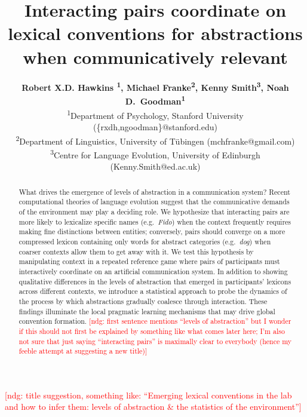 \documentclass[10pt,letterpaper]{article}
\title{Interacting pairs coordinate on lexical conventions for abstractions \\ when communicatively relevant}
\author{{\large \bf Robert X.D. Hawkins \textsuperscript{1}, Michael Franke\textsuperscript{2}, Kenny Smith\textsuperscript{3}, Noah D.~Goodman\textsuperscript{1}} \\
   \textsuperscript{1}Department of Psychology, Stanford University (\{rxdh,ngoodman\}@stanford.edu) \\
  \textsuperscript{2}Department of Linguistics, University of T\"ubingen (mchfranke@gmail.com)\\
  \textsuperscript{3}Centre for Language Evolution, University of Edinburgh (Kenny.Smith@ed.ac.uk)}
\newcommand{\mf}[1]{\textcolor{Red}{[ndg: #1]}}
\begin{document}
\maketitle


\mf{title suggestion, something like: ``Emerging lexical conventions in the lab and how to
  infer them: levels of abstraction \& the statistics of the environment''}

\begin{abstract}
What drives the emergence of levels of abstraction in a communication system? Recent computational theories of language evolution suggest that the communicative demands of the environment may play a deciding role. We hypothesize that interacting pairs are more likely to lexicalize specific names (e.g.\ \emph{Fido}) when the context frequently requires making fine distinctions between entities; conversely, pairs should converge on a more compressed lexicon containing only words for abstract categories (e.g.\ \emph{dog}) when coarser contexts allow them to get away with it. We test this hypothesis by manipulating context in a repeated reference game where pairs of participants must interactively coordinate on an artificial communication system. In addition to showing qualitative differences in the levels of abstraction that emerged in participants' lexicons across different contexts, we introduce a statistical approach to probe the dynamics of the process by which abstractions gradually coalesce through interaction. These findings illuminate the local pragmatic learning mechanisms that may drive global convention formation.
\mf{first sentence mentions ``levels of abstraction'' but I wonder if this should not first be explained by something like what comes later here; I'm also not sure that just saying ``interacting pairs'' is maximally clear to everybody (hence my feeble attempt at suggesting a new title)}
\end{abstract}

\end{document}
